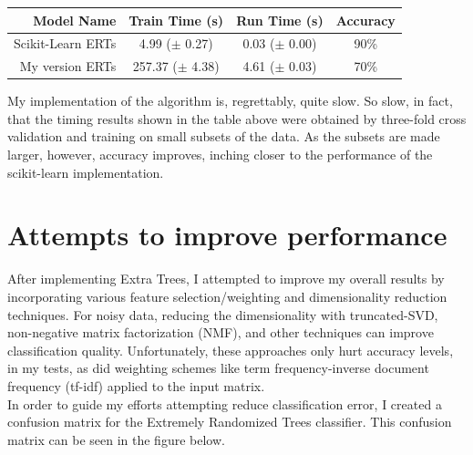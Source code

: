 \documentclass[letter,12pt]{report}
\begin{document}
\begin{center}
	\begin{tabular}{ | r | c | c | c | }
    \hline
    Model Name & Train Time (s) & Run Time (s) & Accuracy \\ \hline \hline
	Scikit-Learn ERTs & 4.99 ($\pm$ 0.27) & 0.03 ($\pm$ 0.00) & 90\% \\ \hline
	My version ERTs & 257.37 ($\pm$ 4.38) & 4.61 ($\pm$ 0.03) & 70\% \\ \hline
    \end{tabular}
\end{center} 

\vspace{0.4cm}

My implementation of the algorithm is, regrettably, quite slow.  So slow, in fact, that the timing results shown in the table above were obtained by three-fold cross validation and training on small subsets of the data.  As the subsets are made larger, however, accuracy improves, inching closer to the performance of the scikit-learn implementation.  \\

\section*{Attempts to improve performance}

After implementing Extra Trees, I attempted to improve my overall results by incorporating various feature selection/weighting and dimensionality reduction techniques.  For noisy data, reducing the dimensionality with truncated-SVD, non-negative matrix factorization (NMF), and other techniques can improve classification quality.  Unfortunately, these approaches only hurt accuracy levels, in my tests, as did weighting schemes like term frequency-inverse document frequency (tf-idf) applied to the input matrix. \\

In order to guide my efforts attempting reduce classification error, I created a confusion matrix for the Extremely Randomized Trees classifier.  This confusion matrix can be seen in the figure below. 

\newpage 
\end{document}
